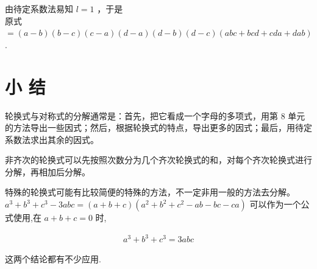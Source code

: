 \documentclass[10pt]{article}
\begin{document}
由待定系数法易知 $l=1$ ，于是\\
原式\\
$=(a-b)(b-c)(c-a)(d-a)(d-b)(d-c)(a b c+b c d+c d a+d a b)$.

\section*{小 结}
轮换式与对称式的分解通常是：首先，把它看成一个字母的多项式，用第 8 单元的方法导出一些因式；然后，根据轮换式的特点，导出更多的因式；最后，用待定系数法求出其余的因式。

非齐次的轮换式可以先按照次数分为几个齐次轮换式的和，对每个齐次轮换式进行分解，再相加后分解。

特殊的轮换式可能有比较简便的特殊的方法，不一定非用一般的方法去分解。\\
$a^{3}+b^{3}+c^{3}-3 a b c=(a+b+c)\left(a^{2}+b^{2}+c^{2}-a b-b c-c a\right)$ 可以作为一个公式使用,在 $a+b+c=0$ 时,

\begin{align*}
a^{3}+b^{3}+c^{3}=3 a b c
\end{align*}

这两个结论都有不少应用.
\end{document}
